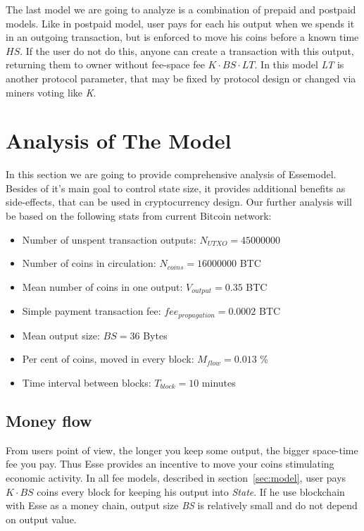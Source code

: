 \documentclass[]{article}   %
\newcommand{\esse}{Esse}
\newcommand{\state}{\textit{State}}
\begin{document}
The last model we are going to analyze is a combination of prepaid and postpaid models. Like in postpaid model, user pays for each his output when we spends it in an outgoing transaction, but is enforced to move his coins before a known time \textit{$HS$}. If the user do not do this, anyone can create a transaction with this output, returning them to owner without fee-space fee ${K \cdot BS \cdot LT}$. In this model \textit{LT} is another protocol parameter, that may be fixed by protocol design or changed via miners voting like \textit{K}.

\section{Analysis of The Model}
\label{sec:analysis}

In this section we are going to provide comprehensive analysis of \esse model. Besides of it's main goal to control state size, it provides additional benefits as side-effects, that can be used in cryptocurrency design. Our further analysis will be based on the following stats from current Bitcoin network:

\begin{itemize}
  \item Number of unspent transaction outputs: $N_{UTXO}=45000000$
  \item Number of coins in circulation: $N_{coins}=16000000$ BTC
  \item Mean number of coins in one output: $V_{output}=0.35$ BTC
  \item Simple payment transaction fee: $fee_{propagation}=0.0002$ BTC
  \item Mean output size: $BS=36$ Bytes
  \item Per cent of coins, moved in every block: $M_{flow}=0.013$ \%
  \item Time interval between blocks: $T_{block}=10$ minutes
\end{itemize}

\subsection{Money flow}

From users point of view, the longer you keep some output, the bigger space-time fee you pay. Thus \esse{} provides an incentive to move your coins stimulating economic activity. In all fee models, described in section~\ref{sec:model}, user pays ${K \cdot BS}$ coins every block for keeping his output into \state{}. If he use blockchain with \esse{} as a money chain, output size \textit{BS} is relatively small and do not depend on output value.
\end{document}
